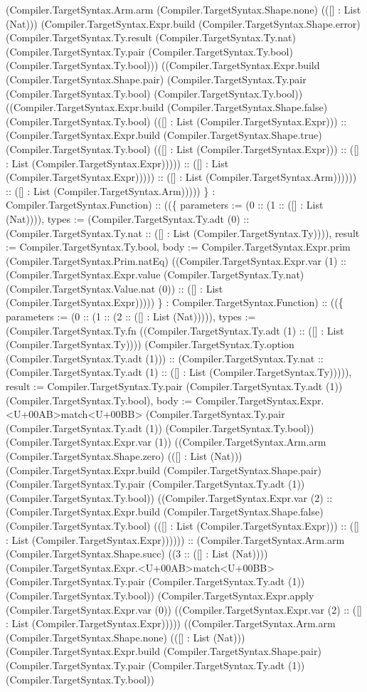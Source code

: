 \documentclass[11pt]{article}
\begin{document}
(Compiler.TargetSyntax.Arm.arm (Compiler.TargetSyntax.Shape.none) (([] : List (Nat))) (Compiler.TargetSyntax.Expr.build (Compiler.TargetSyntax.Shape.error) (Compiler.TargetSyntax.Ty.result (Compiler.TargetSyntax.Ty.nat) (Compiler.TargetSyntax.Ty.pair (Compiler.TargetSyntax.Ty.bool) (Compiler.TargetSyntax.Ty.bool))) ((Compiler.TargetSyntax.Expr.build (Compiler.TargetSyntax.Shape.pair) (Compiler.TargetSyntax.Ty.pair (Compiler.TargetSyntax.Ty.bool) (Compiler.TargetSyntax.Ty.bool)) ((Compiler.TargetSyntax.Expr.build (Compiler.TargetSyntax.Shape.false) (Compiler.TargetSyntax.Ty.bool) (([] : List (Compiler.TargetSyntax.Expr))) :: (Compiler.TargetSyntax.Expr.build (Compiler.TargetSyntax.Shape.true) (Compiler.TargetSyntax.Ty.bool) (([] : List (Compiler.TargetSyntax.Expr))) :: ([] : List (Compiler.TargetSyntax.Expr))))) :: ([] : List (Compiler.TargetSyntax.Expr))))) :: ([] : List (Compiler.TargetSyntax.Arm)))))) :: ([] : List (Compiler.TargetSyntax.Arm))))) \} : Compiler.TargetSyntax.Function) :: ((\{ parameters := (0 :: (1 :: ([] : List (Nat)))), types := (Compiler.TargetSyntax.Ty.adt (0) :: (Compiler.TargetSyntax.Ty.nat :: ([] : List (Compiler.TargetSyntax.Ty)))), result := Compiler.TargetSyntax.Ty.bool, body := Compiler.TargetSyntax.Expr.prim (Compiler.TargetSyntax.Prim.natEq) ((Compiler.TargetSyntax.Expr.var (1) :: (Compiler.TargetSyntax.Expr.value (Compiler.TargetSyntax.Ty.nat) (Compiler.TargetSyntax.Value.nat (0)) :: ([] : List (Compiler.TargetSyntax.Expr))))) \} : Compiler.TargetSyntax.Function) :: ((\{ parameters := (0 :: (1 :: (2 :: ([] : List (Nat))))), types := (Compiler.TargetSyntax.Ty.fn ((Compiler.TargetSyntax.Ty.adt (1) :: ([] : List (Compiler.TargetSyntax.Ty)))) (Compiler.TargetSyntax.Ty.option (Compiler.TargetSyntax.Ty.adt (1))) :: (Compiler.TargetSyntax.Ty.nat :: (Compiler.TargetSyntax.Ty.adt (1) :: ([] : List (Compiler.TargetSyntax.Ty))))), result := Compiler.TargetSyntax.Ty.pair (Compiler.TargetSyntax.Ty.adt (1)) (Compiler.TargetSyntax.Ty.bool), body := Compiler.TargetSyntax.Expr.<U+00AB>match<U+00BB> (Compiler.TargetSyntax.Ty.pair (Compiler.TargetSyntax.Ty.adt (1)) (Compiler.TargetSyntax.Ty.bool)) (Compiler.TargetSyntax.Expr.var (1)) ((Compiler.TargetSyntax.Arm.arm (Compiler.TargetSyntax.Shape.zero) (([] : List (Nat))) (Compiler.TargetSyntax.Expr.build (Compiler.TargetSyntax.Shape.pair) (Compiler.TargetSyntax.Ty.pair (Compiler.TargetSyntax.Ty.adt (1)) (Compiler.TargetSyntax.Ty.bool)) ((Compiler.TargetSyntax.Expr.var (2) :: (Compiler.TargetSyntax.Expr.build (Compiler.TargetSyntax.Shape.false) (Compiler.TargetSyntax.Ty.bool) (([] : List (Compiler.TargetSyntax.Expr))) :: ([] : List (Compiler.TargetSyntax.Expr)))))) :: (Compiler.TargetSyntax.Arm.arm (Compiler.TargetSyntax.Shape.succ) ((3 :: ([] : List (Nat)))) (Compiler.TargetSyntax.Expr.<U+00AB>match<U+00BB> (Compiler.TargetSyntax.Ty.pair (Compiler.TargetSyntax.Ty.adt (1)) (Compiler.TargetSyntax.Ty.bool)) (Compiler.TargetSyntax.Expr.apply (Compiler.TargetSyntax.Expr.var (0)) ((Compiler.TargetSyntax.Expr.var (2) :: ([] : List (Compiler.TargetSyntax.Expr))))) ((Compiler.TargetSyntax.Arm.arm (Compiler.TargetSyntax.Shape.none) (([] : List (Nat))) (Compiler.TargetSyntax.Expr.build (Compiler.TargetSyntax.Shape.pair) (Compiler.TargetSyntax.Ty.pair (Compiler.TargetSyntax.Ty.adt (1)) (Compiler.TargetSyntax.Ty.bool)) 
\end{document}
